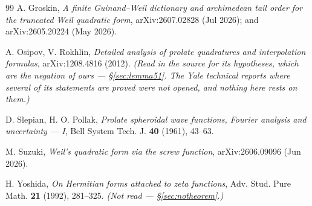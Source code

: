 \documentclass[11pt,a4paper]{article}
\theoremstyle{plain}
\theoremstyle{definition}
\theoremstyle{remark}
\begin{document}
\begin{thebibliography}{99}
A. Groskin,
\emph{A finite Guinand--Weil dictionary and archimedean tail order for the
truncated Weil quadratic form},
arXiv:2607.02828 (Jul 2026); and arXiv:2605.20224 (May 2026).

A. Osipov, V. Rokhlin,
\emph{Detailed analysis of prolate quadratures and interpolation formulas},
arXiv:1208.4816 (2012).
\emph{(Read in the source for its hypotheses, which are the negation of ours ---
\S\ref{sec:lemma51}.  The Yale technical reports where several of its statements
are proved were not opened, and nothing here rests on them.)}

D. Slepian, H. O. Pollak,
\emph{Prolate spheroidal wave functions, Fourier analysis and uncertainty --- I},
Bell System Tech. J. \textbf{40} (1961), 43--63.

M. Suzuki,
\emph{Weil's quadratic form via the screw function},
arXiv:2606.09096 (Jun 2026).

H. Yoshida,
\emph{On Hermitian forms attached to zeta functions},
Adv. Stud. Pure Math. \textbf{21} (1992), 281--325.
\emph{(Not read --- \S\ref{sec:notheorem}.)}

\end{thebibliography}
\end{document}

